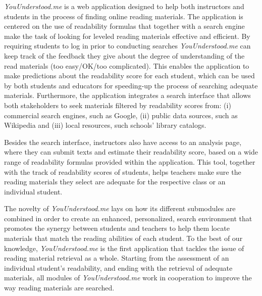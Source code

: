\documentclass{sig-alternate-05-2015}
\begin{document}


\textit{YouUnderstood.me} is a web application designed to help  both instructors and students in the process of finding online reading materials. The application is centered on the use of readability formulas that together with a search engine make the task of looking for leveled reading materials effective and efficient. By requiring students to log in prior to conducting searches \textit{YouUnderstood.me} can keep track of the feedback they give about the degree of understanding of the read materials (too easy/OK/too complicated). This enables the application to make predictions about the readability score for each student, which can be used by both students and educators for speeding-up the process of searching adequate materials. Furthermore, the application integrates a search interface that allows both stakeholders to seek materials filtered by readability scores from: (i) commercial search engines, such as Google, (ii) public data sources, such as Wikipedia and (iii) local resources, such schools' library catalogs.


Besides the search interface, instructors also have access to an analysis page, where they can submit texts and estimate their readability score, based on a wide range of readability formulas provided within the application. This tool, together with the track of readability scores of students, helps teachers make sure the reading materials they select are adequate for the respective class or an individual student.

The novelty of \textit{YouUnderstood.me} lays on how its different submodules are combined in order to create an enhanced, personalized, search environment that promotes the synergy between students and teachers to help them locate materials that match the reading abilities of each student.
To the best of our knowledge, \textit{YouUnderstood.me} is the first application that tackles the issue of reading material retrieval as a whole. Starting from the assessment of an individual student's readability, and ending with the retrieval of adequate materials, all modules of \textit{YouUnderstood.me} work in cooperation to improve the way reading materials are searched.
\end{document}
